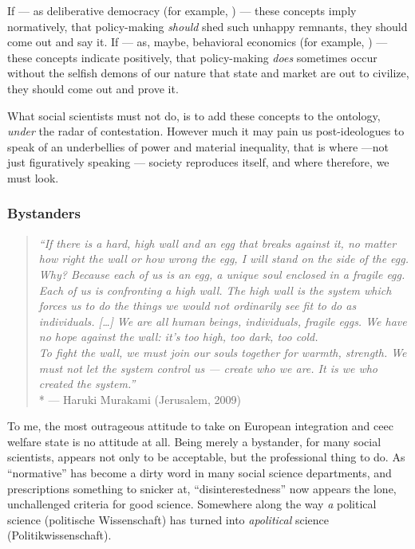 If --- as deliberative democracy (for example, \citealt{Elster-1998-aa}) --- these concepts imply normatively, that policy-making \emph{should} shed such unhappy remnants, they should come out and say it.
If --- as, maybe, behavioral economics (for example, \citealt{Tomasello2009}) --- these concepts indicate positively, that policy-making \emph{does} sometimes occur without the selfish demons of our nature that state and market are out to civilize, they should come out and prove it.

What social scientists must not do, is to add these concepts to the ontology, \emph{under} the radar of contestation.
However much it may pain us post-ideologues to speak of \citeauthor{Agnoli-1989-aa}an underbellies of power and material inequality, that is where ---not just figuratively speaking --- society reproduces itself, and where therefore, we must look.

\subsubsection{Bystanders}

\begin{quotation}
	\emph{``If there is a hard, high wall and an egg that breaks against it, no matter how right the wall or how wrong the egg, I will stand on the side of the egg.
	\\
	Why?
	Because each of us is an egg, a unique soul enclosed in a fragile egg.
	Each of us is confronting a high wall.
	The high wall is the system which forces us to do the things we would not ordinarily see fit to do as individuals.
	[\ldots] We are all human beings, individuals, fragile eggs.
	We have no hope against the wall:
	it's too high, too dark, too cold.
	\\
	To fight the wall, we must join our souls together for warmth, strength.
	We must not let the system control us --- create who we are.
	It is we who created the system.''}
	\\*
	--- Haruki Murakami (Jerusalem, 2009)
\end{quotation}

To me, the most outrageous attitude to take on European integration and \gls{ceec} welfare state is no attitude at all.
Being merely a bystander, for many social scientists, appears not only to be acceptable, but the professional thing to do.
As ``normative'' has become a dirty word in many social science departments, and prescriptions something to snicker at, ``disinterestedness'' now appears the lone, unchallenged criteria for good science.
Somewhere along the way \emph{a} political science (politische Wissenschaft) has turned into \emph{apolitical} science (Politikwissenschaft).

